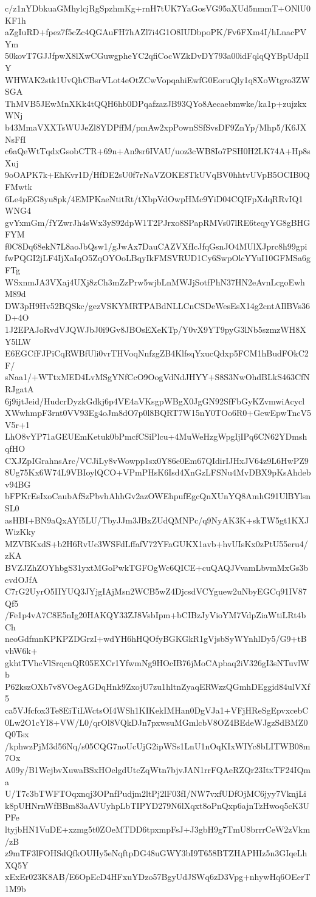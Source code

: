 c/z1nYDbkuaGMhylcjRgSpzhmKg+rnH7tUK7YaGosVG95aXUd5nmmT+ONlU0KF1h
aZgIuRD+fpez7f5cZc4QGAuFH7hAZl7i4G1O8IUDbpoPK/Fv6FXm4I/hLnacPVYm
50kovT7GJJfpwX8lXwCGuwgpheYC2qfiCocWZkDvDY793a00idFqlqQYBpUdplIY
WHWAK2stk1UvQhCBsrVLot4eOtZCwVopqahiEwfG0EoruQly1q8XoWtgro3ZWSGA
ThMVB5JEwMnXKk4tQQH6hb0DPqafzazJB93QYo8Aecaebmwke/ka1p+zujzkxWNj
b43MmaVXXTsWUJeZl8YDPffM/pmAw2xpPownSSfSvsDF9ZnYp/Mhp5/K6JXNsFfI
c6aQeWtTqdxGsobCTR+69n+An9sr6IVAU/uoz3cWB8Io7PSH0H2LK74A+Hp8sXuj
9oOAPK7k+EhKvr1D/HfDE2sU0f7rNaVZOKE8TkUVqBV0hhtvUVpB5OCIB0QFMwtk
6Le4pEG8yu8pk/4EMPKaeNtitRt/tXbpVdOwpHMc9YiD04CQIFpXdqRRvIQ1WNG4
gvYxmGm/fYZwrJh4sWx3yS92dpW1T2PJrxo8SPapRMVs07lRE6teqyYG8gBHGFYM
f0C8Dq68ekN7L8aoJbQsw1/gJwAx7DauCAZVXfIcJfqGsnJO4MUlXJprc8h99gpi
fwPQGI2jLF4IjXaIqO5ZqOYOoLBqyIkFMSVRUD1Cy6SwpOlcYYuI10GFMSa6gFTg
WSxnmJA3VXaj4UXj8zCh3mZzPrw5wjbLnMWJjSotfPhN37HN2eAvnLcgoEwhM89d
DW3pH9Hv52BQSkc/gezVSKYMRTPABdNLLCnCSDeWesEsX14g2cntAIlBVs36D+4O
1J2EPAJoRvdVJQWJbJ0i9Gv8JBOsEXeKTp/Y0vX9YT9pyG3lNb5szmzWH8XY5lLW
E6EGCfFJPiCqRWBfUli0vrTHVoqNnfzgZB4KlfsqYxucQdxp5FCM1hBudFOkC2F/
sNaa1/+WTtxMED4LvMSgYNfCcO9OogVdNdJHYY+S8S3NwOhdBLkS463CfNRJgatA
6j9ijtJeid/HudcrDyzkGdkj6p4VE4aVKsgpWBgX0JgGN92SfFbGyKZvmwiAcycl
XWwhmpF3rnt0VV93Eg4oJm8dO7p0l8BQRT7W15nY0TOo6R0+GewEpwTncV5V5r+1
LhO8vYP71aGEUEmKetuk0bPmcfCSiPlcu+4MuWeHzgWpgIjIPq6CN62YDmshqfHO
CXJZpIGrahnsArc/VCJiLy8vWowpp1sx0Y86e0Em67QIdirIJHxJV64z9L6HwPZ9
8Ug75Kx6W74L9VBIoylQCO+VPmPHsK6Isd4XnGzLFSNu4MvDBX9pKsAhdebv94BG
bFPKrEsIxoCaubAfSzPbvhAhhGv2azOWEhpufEgcQnXUnYQ8AmhG91UlBYlsnSL0
asHBI+BN9aQxAYf5LU/TbyJJm3JBxZUdQMNPc/q9NyAK3K+skTW5gt1KXJWizKky
MZVBKxdS+b2H6RvUc3WSFdLffafV72YFaGUKX1avb+hvUIsKx0zPtU55eru4/zKA
BVZJZhZOYhbgS31yxtMGoPwkTGFOgWc6QICE+cuQAQJVvamLbvmMxGs3bcvdOJfA
C7rG2UyrO5IIYUQ3JYjgIAjMsn2WCB5wZ4DjcsdVCYguew2uNbyEGCq91IV87Qf5
/Fe1p4vA7C8E5nIg20HAKQY33ZJ8VsbIpm+bCIBzJyVioYM7VdpZiaWtiLRt4bCh
neoGdfmnKPKPZDGrzI+wdYH6hHQOfyBGKGkR1gVjsbSyWYnhlDy5/G9+tBvhW6k+
gkhtTVhcVlSrqcnQR05EXCr1YfwmNg9HOcIB76jMoCApbaq2iV326gI3sNTuvlWb
P62kszOXb7v8VOegAGDqHnk9ZxojU7zu1hltnZyaqERWzzQGmhDEggid84ulVXf5
ca5VJfcfox3Te8EiTiLWctsOI4WSh1KIKekIMHan0DgVJa1+VFjHReSgEpvxcebC
0Lw2O1cYI8+VW/L0/qrOl8VQkDJn7pxwsuMGmlcbV8OZ4BEdeWJgzSdBMZ0Q0Tsx
/kphwzPjM3d56Nq/s05CQG7noUcUjG2ipWSs1LnU1nOqKIxWIYc8bLITWB08m7Ox
A09y/B1WejbvXuwaBSxHOelgdUtcZqWtn7bjvJAN1rrFQAeRZQr23ItxTF24IQma
U/T7c3bTWFTOqxnqj3OPnfPudjm2ltPj2lF03fI/NW7vxfUDfOjMC6jyy7VknjLi
k8pUHNrnWfBBm83aAVUyhpLbTIPYD279N6lXqxt8oPnQxp6ajnTzHwoq5cK3UPFe
ltyjbHN1VuDE+xzmg5t0ZOeMTDD6tpxmpFsJ+J3gbH9g7TmU8brrrCeW2zVkm/zB
z9mTF3lFOHSdQfkOUHy5eNqftpDG48uGWY3bI9T658BTZHAPHIz5n3GIqeLhXQ5Y
xExEr023K8AB/E6OpEcD4HFxuYDzo57BgyUdJSWq6zD3Vpg+nhywHq6OEerT1M9b

